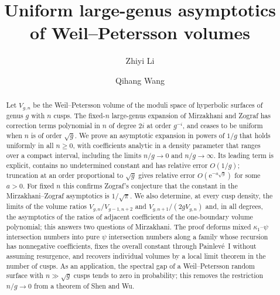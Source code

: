 \documentclass[11pt]{amsart}
\title[Uniform large-genus volume asymptotics]{Uniform large-genus asymptotics\\ of Weil--Petersson volumes}
\author{Zhiyi Li}
\author{Qihang Wang}
\date{}
\makeatletter
\numberwithin{equation}{section}
\newcommand{\cleartitlepageaddresses}{\global\let\addresses\@empty}
\theoremstyle{definition}
\theoremstyle{remark}
\makeatother
\begin{document}
\begin{abstract}
Let $V_{g,n}$ be the Weil--Petersson volume of the moduli space of hyperbolic surfaces of genus $g$ with $n$ cusps. The fixed-$n$ large-genus expansion of Mirzakhani and Zograf has correction terms polynomial in $n$ of degree $2i$ at order $g^{-i}$, and ceases to be uniform when $n$ is of order $\sqrt g$. We prove an asymptotic expansion in powers of $1/g$ that holds uniformly in all $n\ge0$, with coefficients analytic in a density parameter that ranges over a compact interval, including the limits $n/g\to0$ and $n/g\to\infty$. Its leading term is explicit, contains no undetermined constant and has relative error $O(1/g)$; truncation at an order proportional to $\sqrt g$ gives relative error $O(\mathrm{e}^{-a\sqrt g})$ for some $a>0$. For fixed $n$ this confirms Zograf's conjecture that the constant in the Mirzakhani--Zograf asymptotics is $1/\sqrt\pi$. We also determine, at every cusp density, the limits of the volume ratios $V_{g,n}/V_{g-1,n+2}$ and $V_{g,n+1}/(2gV_{g,n})$ and, in all degrees, the asymptotics of the ratios of adjacent coefficients of the one-boundary volume polynomial; this answers two questions of Mirzakhani. The proof deforms mixed $\kappa_1$--$\psi$ intersection numbers into pure $\psi$ intersection numbers along a family whose recursion has nonnegative coefficients, fixes the overall constant through Painlev\'e~I without assuming resurgence, and recovers individual volumes by a local limit theorem in the number of cusps. As an application, the spectral gap of a Weil--Petersson random surface with $n\gg\sqrt g$ cusps tends to zero in probability; this removes the restriction $n/g\to0$ from a theorem of Shen and Wu.
\end{abstract}
\maketitle
\cleartitlepageaddresses
\clearpage
\setcounter{tocdepth}{1}
\tableofcontents
\clearpage















\appendix









\end{document}
